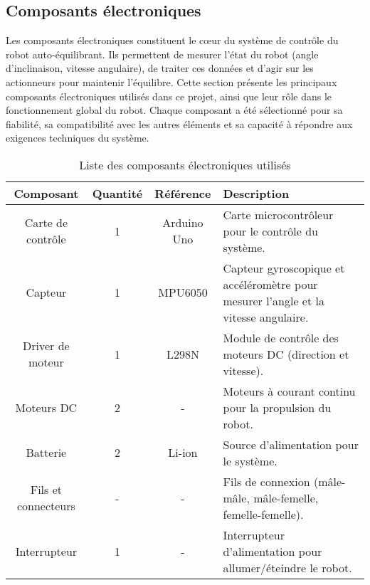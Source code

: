 \documentclass{report}
\begin{document}
\subsection{Composants électroniques}
Les composants électroniques constituent le cœur du système de contrôle du robot auto-équilibrant. Ils permettent de mesurer l'état du robot (angle d'inclinaison, vitesse angulaire), de traiter ces données et d'agir sur les actionneurs pour maintenir l'équilibre. Cette section présente les principaux composants électroniques utilisés dans ce projet, ainsi que leur rôle dans le fonctionnement global du robot. Chaque composant a été sélectionné pour sa fiabilité, sa compatibilité avec les autres éléments et sa capacité à répondre aux exigences techniques du système.
\begin{table}[h!]
\centering
\caption{Liste des composants électroniques utilisés}
\label{tab:composants_electroniques}
\begin{tabular}{|c|c|c|p{5cm}|}
\hline
\textbf{Composant} & \textbf{Quantité} & \textbf{Référence} & \textbf{Description} \\ \hline
Carte de contrôle & 1 & Arduino Uno & Carte microcontrôleur pour le contrôle du système. \\ \hline
Capteur & 1 & MPU6050 & Capteur gyroscopique et accéléromètre pour mesurer l'angle et la vitesse angulaire. \\ \hline
Driver de moteur & 1 & L298N & Module de contrôle des moteurs DC (direction et vitesse). \\ \hline
Moteurs DC & 2 & - & Moteurs à courant continu pour la propulsion du robot. \\ \hline
Batterie & 2 & Li-ion  & Source d'alimentation pour le système. \\ \hline

Fils et connecteurs & - & - & Fils de connexion (mâle-mâle, mâle-femelle, femelle-femelle). \\ \hline
Interrupteur & 1 & - & Interrupteur d'alimentation pour allumer/éteindre le robot. \\ \hline
\end{tabular}
\end{table}
\vspace{10cm}
\end{document}
